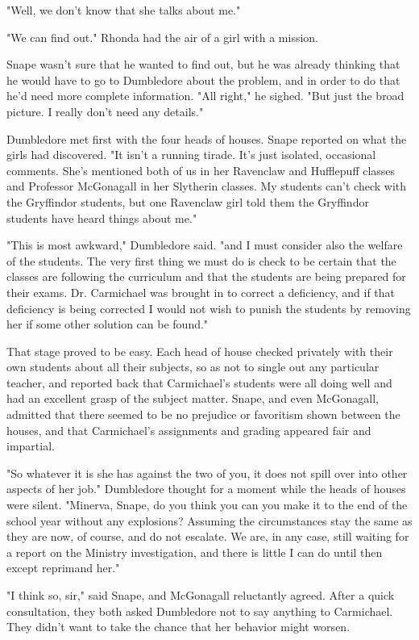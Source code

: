 "Well, we don't know that she talks about me."

"We can find out." Rhonda had the air of a girl with a mission.

Snape wasn't sure that he wanted to find out, but he was already thinking that he would have to go to Dumbledore about the problem, and in order to do that he'd need more complete information. "All right," he sighed. "But just the broad picture. I really don't need any details."

Dumbledore met first with the four heads of houses. Snape reported on what the girls had discovered. "It isn't a running tirade. It's just isolated, occasional comments. She's mentioned both of us in her Ravenclaw and Hufflepuff classes and Professor McGonagall in her Slytherin classes. My students can't check with the Gryffindor students, but one Ravenclaw girl told them the Gryffindor students have heard things about me."

"This is most awkward," Dumbledore said. "and I must consider also the welfare of the students. The very first thing we must do is check to be certain that the classes are following the curriculum and that the students are being prepared for their exams. Dr. Carmichael was brought in to correct a deficiency, and if that deficiency is being corrected I would not wish to punish the students by removing her if some other solution can be found."

That stage proved to be easy. Each head of house checked privately with their own students about all their subjects, so as not to single out any particular teacher, and reported back that Carmichael's students were all doing well and had an excellent grasp of the subject matter. Snape, and even McGonagall, admitted that there seemed to be no prejudice or favoritism shown between the houses, and that Carmichael's assignments and grading appeared fair and impartial.

"So whatever it is she has against the two of you, it does not spill over into other aspects of her job." Dumbledore thought for a moment while the heads of houses were silent. "Minerva, Snape, do you think you can you make it to the end of the school year without any explosions? Assuming the circumstances stay the same as they are now, of course, and do not escalate. We are, in any case, still waiting for a report on the Ministry investigation, and there is little I can do until then except reprimand her."

"I think so, sir," said Snape, and McGonagall reluctantly agreed. After a quick consultation, they both asked Dumbledore not to say anything to Carmichael. They didn't want to take the chance that her behavior might worsen.

